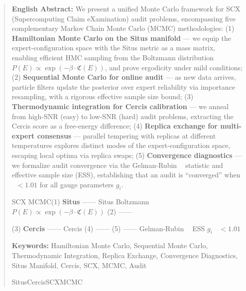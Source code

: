 \documentclass[12pt,a4paper]{article}
\theoremstyle{plain}
\theoremstyle{definition}
\newcommand{\Cercis}{\mathfrak{C}}
\DeclareMathOperator{\Rhat}{\hat{R}}
\begin{document}
\newpage
\tableofcontents
\newpage


\begin{abstract}
\noindent
\textbf{English Abstract:} We present a unified Monte Carlo framework for SCX
(Supercomputing Claim eXamination) audit problems, encompassing five complementary
Markov Chain Monte Carlo (MCMC) methodologies: (1) \textbf{Hamiltonian Monte Carlo
on the Situs manifold} — we equip the expert-configuration space with the Situs
metric as a mass matrix, enabling efficient HMC sampling from the Boltzmann
distribution $P(E) \propto \exp(-\beta \cdot \Cercis(E))$, and prove ergodicity
under mild conditions; (2) \textbf{Sequential Monte Carlo for online audit} —
as new data arrives, particle filters update the posterior over expert
reliability via importance resampling, with a rigorous effective sample size
bound; (3) \textbf{Thermodynamic integration for Cercis calibration} — we
anneal from high-SNR (easy) to low-SNR (hard) audit problems, extracting the
Cercis score as a free-energy difference; (4) \textbf{Replica exchange for
multi-expert consensus} — parallel tempering with replicas at different
temperatures explores distinct modes of the expert-configuration space,
escaping local optima via replica swaps; (5) \textbf{Convergence diagnostics}
— we formalize audit convergence via the Gelman-Rubin $\Rhat$ statistic and
effective sample size (ESS), establishing that an audit is ``converged'' when
$\Rhat < 1.01$ for all gauge parameters $g_i$.

\vspace{6pt}
\noindent
\textbf{}  SCX
MCMC(1) \textbf{Situs 
}—— Situs  Boltzmann 
$P(E) \propto \exp(-\beta \cdot \Cercis(E))$ 
(2) \textbf{}——

(3) \textbf{Cercis }——
 Cercis (4) \textbf{}
——
(5) \textbf{}—— Gelman-Rubin $\Rhat$ 
ESS $g_i$  $\Rhat < 1.01$ 


\vspace{6pt}
\noindent
\textbf{Keywords:} Hamiltonian Monte Carlo, Sequential Monte Carlo, Thermodynamic
Integration, Replica Exchange, Convergence Diagnostics, Situs Manifold, Cercis,
SCX, MCMC, Audit

\noindent
\textbf{} 
SitusCercisSCXMCMC
\end{abstract}

\newpage

\end{document}
